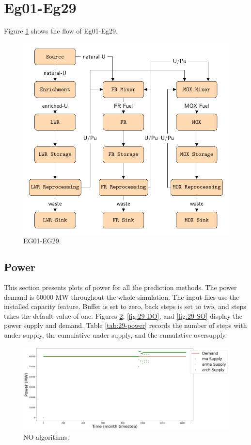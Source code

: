 \documentclass[11pt]{article}
\begin{document}
\section{Eg01-Eg29}

Figure \ref{fig:29flow} shows the flow of Eg01-Eg29.

\begin{figure}[H]
	\centering
	\includegraphics[width=\textwidth]{29-figures/29flow.pdf} 
	\hfill
	\caption{EG01-EG29.}
	\label{fig:29flow}
\end{figure}

\subsection{Power}

This section presents plots of power for all the prediction methods. The power demand is 60000 MW throughout the whole simulation. The input files use the installed capacity feature. Buffer is set to zero, back steps is set to two, and steps takes the default value of one.
Figures \ref{fig:29-NO}, \ref{fig:29-DO}, and \ref{fig:29-SO} display the power supply and demand.
Table \ref{tab:29-power} records the number of steps with under supply, the cumulative under supply, and the cumulative oversupply.

\begin{figure}[H]
	\centering
	\includegraphics[width=\textwidth]{29-figures/29-power0-buffer01.png} 
	\hfill
	\caption{NO algorithms.}
	\label{fig:29-NO}
\end{figure}
\end{document}
